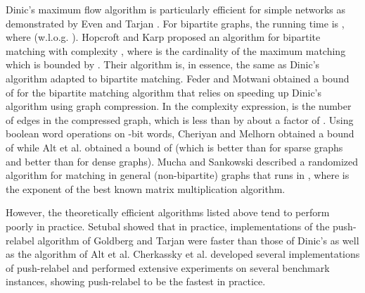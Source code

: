 \documentclass{article}
\begin{document}
Dinic's \cite{Din70} maximum flow algorithm is particularly efficient for simple networks as demonstrated by Even and Tarjan \cite{EveT75}. For bipartite graphs, the running time is , where  (w.l.o.g. ).  Hopcroft and Karp \cite{HopK73} proposed an algorithm for bipartite matching with complexity , where  is the cardinality of the maximum matching which is bounded by . Their algorithm is, in essence, the same as Dinic's algorithm adapted to bipartite matching. Feder and Motwani \cite{FedM91} obtained a bound of  for the bipartite matching algorithm that relies on speeding up Dinic's algorithm using graph compression. In the complexity expression,  is the number of edges in the compressed graph, which is less than  by about a factor of .  Using boolean word operations on -bit words, Cheriyan and Melhorn \cite{CheM96} obtained a bound of  while Alt et al. \cite{AltBMP91} obtained a bound of  (which is better than  for sparse graphs and better than  for dense graphs).  Mucha and Sankowski \cite{MucS04} described a randomized algorithm for matching in general (non-bipartite) graphs that runs in , where  is the exponent of the best known matrix multiplication algorithm.

However, the theoretically efficient algorithms listed above tend to perform poorly in practice. Setubal \cite{Set93, Set96} showed that in practice, implementations of the push-relabel algorithm of Goldberg and Tarjan \cite{GolT88} were faster than those of Dinic's as well as the algorithm of Alt et al.  Cherkassky et al. \cite{CheGMSS98} developed several implementations of push-relabel and performed extensive experiments on several benchmark instances, showing push-relabel to be the fastest in practice.
\end{document}
